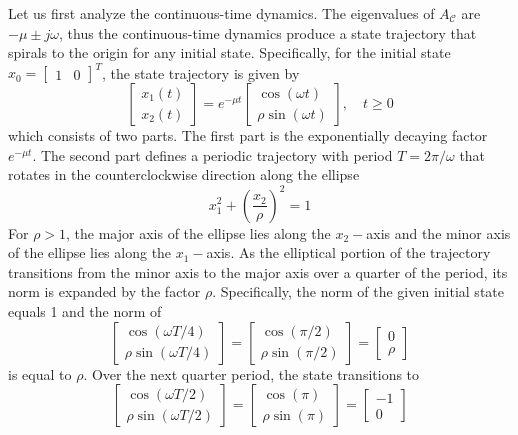 \documentclass[11pt,a4paper]{article}
\begin{document}
Let us first analyze the continuous-time dynamics.  The eigenvalues of $A_\mathcal{C}$ are $- \mu \pm j \omega$,
thus the continuous-time dynamics produce a state trajectory that spirals to the origin for any initial state.
Specifically, for the initial state $x_0 = [ \begin{array}{cc} 1 & 0 \end{array} ]^T$, the state trajectory is given by
\begin{equation*}
\left[ \begin{array}{c} x_1 (t) \\ x_2 (t) \end{array} \right] =
e^{-\mu t} \left[ \begin{array}{c} \cos (\omega t) \\ \rho \sin (\omega t) \end{array} \right] , \quad t \ge 0
\end{equation*}
which consists of two parts.  The first part is the exponentially decaying factor $e^{-\mu t} $.  The second part
defines a periodic trajectory with period $T =  2 \pi / \omega$ that rotates in the counterclockwise direction along
the ellipse
\begin{equation*}
x_1^2 + \left( \frac{x_2}{\rho} \right)^2 = 1
\end{equation*}
For $\rho > 1$, the major axis of the ellipse lies along the $x_2-$axis and the minor axis of the ellipse lies along the $x_1-$axis.
As the elliptical portion of the trajectory transitions from the minor axis to the major axis over a quarter of the period,
its norm is expanded by the factor $\rho$.
Specifically, the norm of the given initial state equals 1 and the norm of
\begin{equation*}
\left[ \begin{array}{c} \cos (\omega T/4 ) \\ \rho \sin (\omega T/4) \end{array} \right]
=
\left[ \begin{array}{c} \cos (\pi /2 ) \\ \rho \sin (\pi /2) \end{array} \right]
=
\left[ \begin{array}{c} 0\\ \rho \end{array} \right]
\end{equation*}
is equal to $\rho$.
Over the next quarter period, the state transitions to
\begin{equation*}
\left[ \begin{array}{c} \cos (\omega T/2 ) \\ \rho \sin (\omega T/2) \end{array} \right]
=
\left[ \begin{array}{c} \cos (\pi ) \\ \rho \sin (\pi) \end{array} \right]
=
\left[ \begin{array}{c} -1 \\ 0 \end{array} \right]
\end{equation*}
\end{document}
